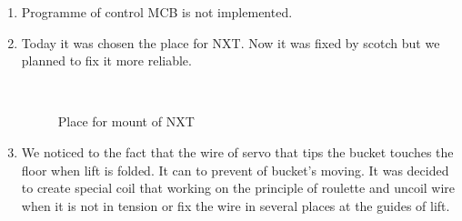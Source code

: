 \begin{enumerate}
\begin{enumerate}
		\item Programme of control MCB is not implemented.
		
		\item Today it was chosen the place for NXT. Now it was fixed by scotch but we planned to fix it more reliable.
		
		\begin{figure}[H]
			\begin{minipage}[h]{0.2\linewidth}
				\center  
			\end{minipage}
			\begin{minipage}[h]{0.6\linewidth}
				\caption{Place for mount of NXT}
			\end{minipage}
		\end{figure}
		
		\item We noticed to the fact that the wire of servo that tips the bucket touches the floor when lift is folded. It can to prevent of bucket's moving. It was decided to create special coil that working on the principle of roulette and uncoil wire when it is not in tension or fix the wire in several places at the guides of lift.
		

\end{enumerate}
\end{enumerate}
